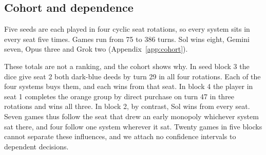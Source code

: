 \subsection{Cohort and dependence}

Five seeds are each played in four cyclic seat rotations, so every system sits in every seat five times. Games run from 75 to 386 turns. Sol wins eight, Gemini seven, Opus three and Grok two (Appendix~\ref{app:cohort}).

These totals are not a ranking, and the cohort shows why. In seed block 3 the dice give seat 2 both dark-blue deeds by turn 29 in all four rotations. Each of the four systems buys them, and each wins from that seat. In block 4 the player in seat 1 completes the orange group by direct purchase on turn 47 in three rotations and wins all three. In block 2, by contrast, Sol wins from every seat. Seven games thus follow the seat that drew an early monopoly whichever system sat there, and four follow one system wherever it sat. Twenty games in five blocks cannot separate these influences, and we attach no confidence intervals to dependent decisions.
